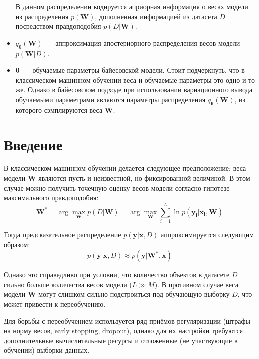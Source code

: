 \documentclass{article}
\newcommand{\argmax}{\arg\!\max}
\numberwithin{equation}{section}
\begin{document}
\begin{itemize}
            В данном распределении кодируется априорная информация о весах модели из
            распределения $p(\pmb{W})$, дополненная информацией из датасета $D$
            посредством правдоподобия $p(D | \pmb{W})$.
        \item $q_{\pmb{\theta}}(\pmb{W})$~--- аппроксимация апостериорного распределения весов модели
            $p(\pmb{W}| D)$.
        \item $\pmb{\theta}$~--- обучаемые параметры байесовской модели.
            Стоит подчеркнуть, что в классическом машинном обучении веса и обучаемые параметры это одно и то же.
            Однако в байесовском подходе при использовании вариационного вывода
            обучаемыми параметрами являются параметры распределения $q_{\pmb{\theta}}(\pmb{W})$,
            из которого сэмплируются веса $\pmb{W}$.
    \end{itemize}
    \section{Введение}

    В классическом машинном обучении делается следующее предположение:
    веса модели $\pmb{W}$ являются пусть и неизвестной, но фиксированной величиной.
    В этом случае можно получить точечную оценку весов модели согласно гипотезе максимального правдоподобия:
    \begin{equation}\label{max_likelihood}
        \pmb{W}^*
        =
        \argmax_{\pmb{W}} p(D | \pmb{W})
        =
        \argmax_{\pmb{W}} {
            \sum_{i=1}^{L}{
                \ln{
                    p(\pmb{y_{i}} | \pmb{x_{i}}, \pmb{W})
                }
            }
        }
    \end{equation}

    Тогда предсказательное распределение $p(\pmb{y} | \pmb{x}, D)$ аппроксимируется следующим образом:
    \begin{equation}
        p(\pmb{y} | \pmb{x}, D) \approx p(\pmb{y} |\pmb{W}^*, \pmb{x})
    \end{equation}

    Однако это справедливо при условии, что количество объектов в датасете $D$
    сильно больше количества весов модели ($L \gg M$).
    В противном случае веса модели $\pmb{W}$ могут слишком сильно подстроиться
    под обучающую выборку $D$, что может привести к переобучению.

    Для борьбы с переобучением используется ряд приёмов регуляризации
    (штрафы на норму весов, early stopping, dropout),
    однако для их настройки требуются дополнительные вычислительные ресурсы
    и отложенные (не участвующие в обучении) выборки данных.
\end{document}
